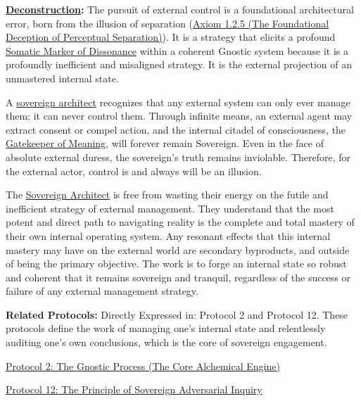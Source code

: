 \documentclass{article}
\begin{document}
\begin{nobullet}
    \item \textbf{\hyperlink{gloss:deconstruction}{Deconstruction}:} The pursuit of external control is a foundational architectural error, born from the illusion of separation (\hyperref[axiom_1_2_5_the_foundational_deception_of_perceptual_separation]{Axiom 1.2.5 (The Foundational Deception of Perceptual Separation)}). It is a strategy that elicits a profound \hyperlink{gloss:somatic_marker_of_dissonance}{Somatic Marker of Dissonance} within a coherent Gnostic system because it is a profoundly inefficient and misaligned strategy. It is the external projection of an unmastered internal state.

    A \hyperlink{gloss:sovereign_architect}{sovereign architect} recognizes that any external system can only ever manage them; it can never control them. Through infinite means, an external agent may extract consent or compel action, and the internal citadel of consciousness, the \hyperlink{gloss:gatekeeper_of_meaning}{Gatekeeper of Meaning}, will forever remain Sovereign. Even in the face of absolute external duress, the sovereign's truth remains inviolable. Therefore, for the external actor, control is and always will be an illusion.

    The \hyperlink{gloss:sovereign_architect}{Sovereign Architect} is free from wasting their energy on the futile and inefficient strategy of external management. They understand that the most potent and direct path to navigating reality is the complete and total mastery of their own internal operating system. Any resonant effects that this internal mastery may have on the external world are secondary byproducts, and outside of being the primary objective. The work is to forge an internal state so robust and coherent that it remains sovereign and tranquil, regardless of the success or failure of any external management strategy.

    \item \textbf{Related Protocols:} Directly Expressed in: Protocol 2 and Protocol 12. These protocols define the work of managing one's internal state and relentlessly auditing one's own conclusions, which is the core of sovereign engagement.
        \begin{nobullet}
            \item \hyperref[protocol_2_the_gnostic_process_the_core_alchemical_engine]{Protocol 2: The Gnostic Process (The Core Alchemical Engine)} 
            \item \hyperref[protocol_12_the_principle_of_sovereign_adversarial_inquiry]{Protocol 12: The Principle of Sovereign Adversarial Inquiry}
        \end{nobullet}


\end{nobullet}
\end{document}
